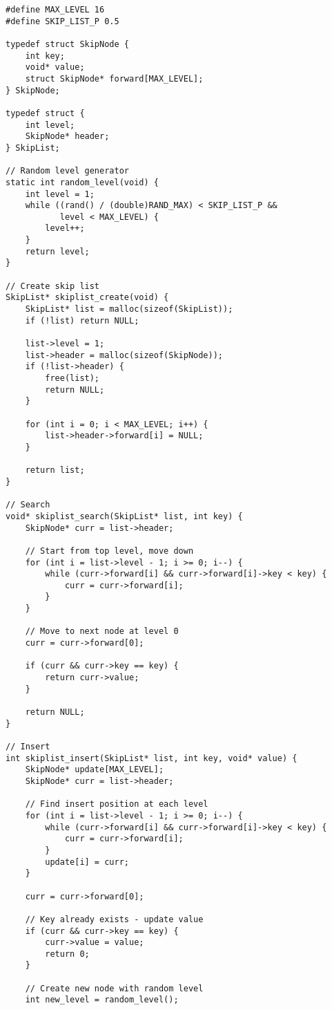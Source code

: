 \begin{lstlisting}
#define MAX_LEVEL 16
#define SKIP_LIST_P 0.5

typedef struct SkipNode {
    int key;
    void* value;
    struct SkipNode* forward[MAX_LEVEL];
} SkipNode;

typedef struct {
    int level;
    SkipNode* header;
} SkipList;

// Random level generator
static int random_level(void) {
    int level = 1;
    while ((rand() / (double)RAND_MAX) < SKIP_LIST_P &&
           level < MAX_LEVEL) {
        level++;
    }
    return level;
}

// Create skip list
SkipList* skiplist_create(void) {
    SkipList* list = malloc(sizeof(SkipList));
    if (!list) return NULL;

    list->level = 1;
    list->header = malloc(sizeof(SkipNode));
    if (!list->header) {
        free(list);
        return NULL;
    }

    for (int i = 0; i < MAX_LEVEL; i++) {
        list->header->forward[i] = NULL;
    }

    return list;
}

// Search
void* skiplist_search(SkipList* list, int key) {
    SkipNode* curr = list->header;

    // Start from top level, move down
    for (int i = list->level - 1; i >= 0; i--) {
        while (curr->forward[i] && curr->forward[i]->key < key) {
            curr = curr->forward[i];
        }
    }

    // Move to next node at level 0
    curr = curr->forward[0];

    if (curr && curr->key == key) {
        return curr->value;
    }

    return NULL;
}

// Insert
int skiplist_insert(SkipList* list, int key, void* value) {
    SkipNode* update[MAX_LEVEL];
    SkipNode* curr = list->header;

    // Find insert position at each level
    for (int i = list->level - 1; i >= 0; i--) {
        while (curr->forward[i] && curr->forward[i]->key < key) {
            curr = curr->forward[i];
        }
        update[i] = curr;
    }

    curr = curr->forward[0];

    // Key already exists - update value
    if (curr && curr->key == key) {
        curr->value = value;
        return 0;
    }

    // Create new node with random level
    int new_level = random_level();


\end{lstlisting}
